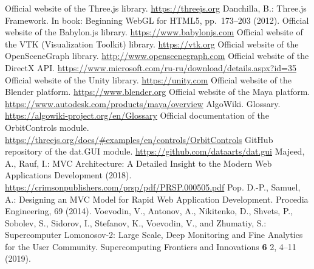 \begin{thebibliography}{}
Official website of the Three.js library. \url{https://threejs.org}
Danchilla, B.:
Three.js Framework. In book: Beginning WebGL for HTML5, pp.~173--203 (2012).
Official website of the Babylon.js library. \url{https://www.babylonjs.com}
Official website of the VTK (Visualization Toolkit) library. \url{https://vtk.org}
Official website of the OpenSceneGraph library. \url{http://www.openscenegraph.com}
Official website of the DirectX API. \url{https://www.microsoft.com/ru-ru/download/details.aspx?id=35}
Official website of the Unity library. \url{https://unity.com}
Official website of the Blender platform. \url{https://www.blender.org}
Official website of the Maya platform. \url{https://www.autodesk.com/products/maya/overview}
AlgoWiki. Glossary. \url{https://algowiki-project.org/en/Glossary}
Official documentation of the OrbitControls module. \url{https://threejs.org/docs/\#examples/en/controls/OrbitControls}
GitHub repository of the dat.GUI module. \url{https://github.com/dataarts/dat.gui}
Majeed, A., Rauf, I.:
MVC Architecture: A Detailed Insight to the Modern Web Applications Development (2018).
\url{https://crimsonpublishers.com/prsp/pdf/PRSP.000505.pdf}
Pop. D.-P., Samuel, A.:
Designing an MVC Model for Rapid Web Application Development. Procedia Engineering, 69 (2014).
Voevodin, V., Antonov, A., Nikitenko, D., Shvets, P., Sobolev, S., Sidorov, I., Stefanov, K., Voevodin, V., and Zhumatiy, S.:
Supercomputer Lomonosov-2: Large Scale, Deep Monitoring and Fine Analytics for the User Community.
Supercomputing Frontiers and Innovations \textbf{6} {2}, 4--11 (2019).




\end{thebibliography}
